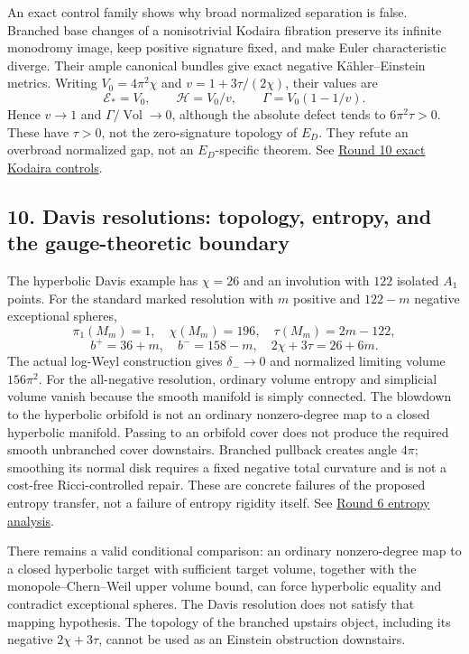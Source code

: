 \documentclass[
  english,
]{article}
\begin{document}
An exact control family shows why broad normalized separation is false.
Branched base changes of a nonisotrivial Kodaira fibration preserve its
infinite monodromy image, keep positive signature fixed, and make Euler
characteristic diverge. Their ample canonical bundles give exact
negative Kähler--Einstein metrics. Writing \(V_0=4\pi^2\chi\) and
\(v=1+3\tau/(2\chi)\), their values are \[
 \mathcal E_*=V_0,\qquad \mathcal H=V_0/v,\qquad
 \Gamma=V_0(1-1/v).
\] Hence \(v\to1\) and \(\Gamma/\operatorname{Vol}\to0\), although the
absolute defect tends to \(6\pi^2\tau>0\). These have \(\tau>0\), not
the zero-signature topology of \(E_D\). They refute an overbroad
normalized gap, not an \(E_D\)-specific theorem. See
\href{../proofs/round10_bundle.md}{Round 10 exact Kodaira controls}.

\hypertarget{davis-resolutions-topology-entropy-and-the-gauge-theoretic-boundary}{%
\subsection{10. Davis resolutions: topology, entropy, and the
gauge-theoretic
boundary}\label{davis-resolutions-topology-entropy-and-the-gauge-theoretic-boundary}}

The hyperbolic Davis example has \(\chi=26\) and an involution with
\(122\) isolated \(A_1\) points. For the standard marked resolution with
\(m\) positive and \(122-m\) negative exceptional spheres, \[
 \pi_1(M_m)=1,\quad \chi(M_m)=196,\quad \tau(M_m)=2m-122,
\] \[
 b^+=36+m,\quad b^-=158-m,\quad 2\chi+3\tau=26+6m.
\] The actual log-Weyl construction gives \(\delta_-\to0\) and
normalized limiting volume \(156\pi^2\). For the all-negative
resolution, ordinary volume entropy and simplicial volume vanish because
the smooth manifold is simply connected. The blowdown to the hyperbolic
orbifold is not an ordinary nonzero-degree map to a closed hyperbolic
manifold. Passing to an orbifold cover does not produce the required
smooth unbranched cover downstairs. Branched pullback creates angle
\(4\pi\); smoothing its normal disk requires a fixed negative total
curvature and is not a cost-free Ricci-controlled repair. These are
concrete failures of the proposed entropy transfer, not a failure of
entropy rigidity itself. See \href{../proofs/round6_entropy.md}{Round 6
entropy analysis}.

There remains a valid conditional comparison: an ordinary nonzero-degree
map to a closed hyperbolic target with sufficient target volume,
together with the monopole--Chern--Weil upper volume bound, can force
hyperbolic equality and contradict exceptional spheres. The Davis
resolution does not satisfy that mapping hypothesis. The topology of the
branched upstairs object, including its negative \(2\chi+3\tau\), cannot
be used as an Einstein obstruction downstairs.
\end{document}
